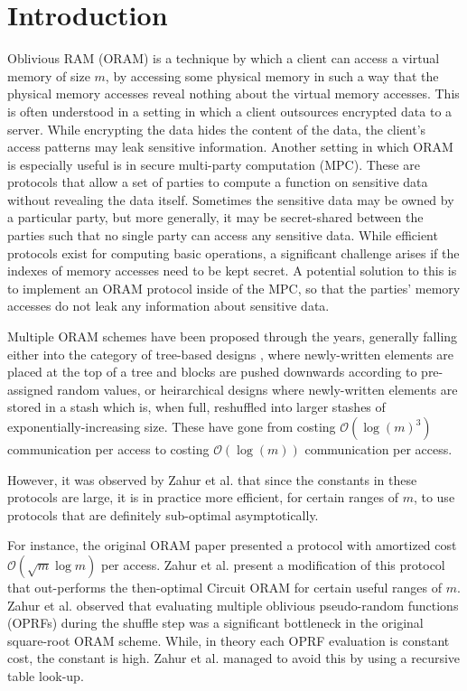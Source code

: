 \section{Introduction}

Oblivious RAM (ORAM) is a technique by which
a client can access a virtual memory of size $m$,
by accessing some physical memory 
in such a way that the physical memory accesses reveal
nothing about the virtual memory accesses.
This is often understood in a setting in which a client
outsources encrypted data to a server.
While encrypting the data hides the content of the data,
the client's access patterns may leak sensitive information.
Another setting in which ORAM is especially useful
is in secure multi-party computation (MPC).
These are protocols that allow a set of parties to compute
a function on sensitive data without revealing the data itself.
Sometimes the sensitive data may be owned by a particular
party, but more generally, it may be secret-shared between
the parties such that no single party can access any sensitive data.
While efficient protocols exist for computing basic operations,
a significant challenge arises if the indexes of memory accesses
need to be kept secret.
A potential solution to this is to implement an ORAM protocol
inside of the MPC, so that the parties' memory accesses
do not leak any information about sensitive data.

Multiple ORAM schemes have been proposed through the years,
generally falling either into the category of 
tree-based designs \cite{shi2011oblivious, stefanov2013path, wang2015circuit},
where newly-written elements are placed at the top of a tree
and blocks are pushed downwards according to pre-assigned random values,
or heirarchical designs \cite{ostrovsky1997private, asharov2018optorama}
where newly-written elements are stored in a stash
which is, when full, reshuffled into larger stashes
of exponentially-increasing size. 
These have gone from costing $\mathcal{O}(\log(m)^3)$ communication
per access to costing $\mathcal{O}(\log(m))$ 
communication per access.

However, it was observed by Zahur et al. \cite{zahur2016revisiting}
that since the constants in these protocols are large,
it is in practice more efficient, for certain ranges of $m$,
to use protocols that are definitely sub-optimal asymptotically.

For instance, the original ORAM paper \cite{ostrovsky1997private} 
presented a protocol with amortized cost $\mathcal{O}(\sqrt{m} \log{m})$
per access.
Zahur et al. present a modification of this protocol
that out-performs the then-optimal Circuit ORAM \cite{wang2015circuit}
for certain useful ranges of $m$.
Zahur et al. observed that evaluating multiple 
oblivious pseudo-random functions (OPRFs)
during the shuffle step was a significant bottleneck in the original 
square-root ORAM scheme.
While, in theory each OPRF evaluation is constant cost, the constant is high.
Zahur et al. managed to avoid this by using a recursive table look-up.

